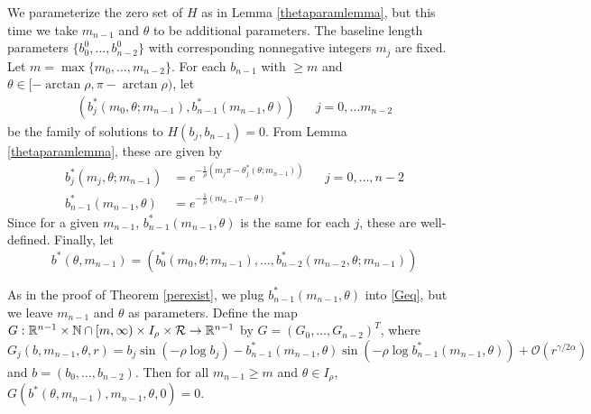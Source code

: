 \documentclass[thesis.tex]{subfiles}
\begin{document}
We parameterize the zero set of $H$ as in Lemma \ref{thetaparamlemma}, but this time we take $m_{n-1}$ and $\theta$ to be additional parameters. The baseline length parameters $\{ b_0^0, \dots, b_{n-2}^0 \}$ with corresponding nonnegative integers $m_j$ are fixed. Let $m = \max\{ m_0, \dots, m_{n-2} \}$. For each $b_{n-1}$ with $\geq m$ and $\theta \in [-\arctan \rho, \pi - \arctan \rho)$, let
\begin{align}
(b_j^*(m_0, \theta; m_{n-1}), b_{n-1}^*(m_{n-1}, \theta)) && j = 0, \dots m_{n-2}
\end{align}
be the family of solutions to $H(b_j, b_{n-1}) = 0$. From Lemma \ref{thetaparamlemma}, these are given by
\begin{equation}\label{bstarm}
\begin{aligned}
b_j^*(m_j, \theta; m_{n-1}) &= e^{-\frac{1}{\rho}(m_j \pi - \theta_j^*(\theta; m_{n-1}))} && j = 0, \dots, n-2 \\
b_{n-1}^*(m_{n-1}, \theta) &= e^{-\frac{1}{\rho}(m_{n-1}\pi - \theta)}
\end{aligned}
\end{equation}
Since for a given $m_{n-1}$, $b_{n-1}^*(m_{n-1}, \theta)$ is the same for each $j$, these are well-defined. Finally, let
\begin{equation}\label{defbstar}
b^*(\theta, m_{n-1}) = 
\left( b_0^*(m_0, \theta; m_{n-1}), \dots, b_{n-2}^*(m_{n-2}, \theta; m_{n-1}) \right)
\end{equation}

As in the proof of Theorem \ref{perexist}, we plug $b_{n-1}^*(m_{n-1}, \theta)$ into \eqref{Geq}, but we leave $m_{n-1}$ and $\theta$ as parameters. Define the map $G: \mathbb{R}^{n-1} \times \mathbb{N} \cap [m, \infty) \times I_\rho \times \mathcal{R} \rightarrow \mathbb{R}^{n-1}$ by $G = (G_0, \dots, G_{n-2})^T$, where 
\begin{equation}\label{Gdef2}
G_j(b, m_{n-1}, \theta, r) = b_j \sin \left( -\rho \log b_j \right) - b_{n-1}^*(m_{n-1}, \theta) \sin \left( -\rho \log b_{n-1}^*(m_{n-1}, \theta) \right) + \mathcal{O}(r^{\gamma / 2 \alpha})
\end{equation}
and $b = (b_0, \dots, b_{n-2})$. Then for all $m_{n-1} \geq m$ and $\theta \in I_\rho$, $G(b^*(\theta, m_{n-1}), m_{n-1}, \theta, 0) = 0$.
\end{document}
